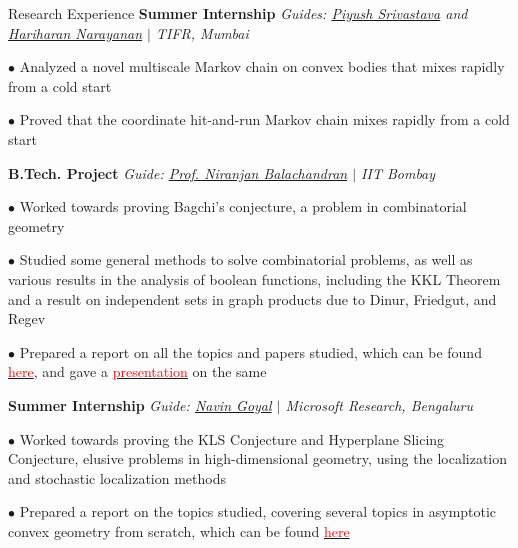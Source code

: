 
\begin{rubric}{Research Experience}
    \entry*[2022] \textbf{Summer Internship} \hfill \emph{Guides: \href{https://www.tifr.res.in/~piyush.srivastava/}{Piyush Srivastava} and \href{https://www.tifr.res.in/~hariharan.narayanan/}{Hariharan Narayanan} $\mid$ TIFR, Mumbai}

        $\bullet$ Analyzed a novel multiscale Markov chain on convex bodies that mixes rapidly from a cold start

        $\bullet$ Proved that the coordinate hit-and-run Markov chain mixes rapidly from a cold start


    \entry*[\phantom{.}2022] \textbf{B.Tech. Project} \hfill \emph{Guide: \href{https://homepages.iitb.ac.in/~niranj/}{Prof. Niranjan Balachandran} $\mid$ IIT Bombay}

        $\bullet$ Worked towards proving Bagchi's conjecture, a problem in combinatorial geometry

        $\bullet$ Studied some general methods to solve combinatorial problems, as well as various results in the analysis of boolean functions, including the KKL Theorem and a result on independent sets in graph products due to Dinur, Friedgut, and Regev

        $\bullet$ Prepared a report on all the topics and papers studied, which can be found \href{https://amitrajaraman.github.io/research/pls/btp1-report.pdf}{\textcolor{red}{here}}, and gave a \href{https://amitrajaraman.github.io/research/pls/btp-presentation.pdf}{\textcolor{red}{presentation}} on the same
    
    \entry*[2021] \textbf{Summer Internship} \hfill \emph{Guide: \href{https://www.microsoft.com/en-us/research/people/navingo/}{Navin Goyal} $\mid$ Microsoft Research, Bengaluru}
        
        $\bullet$ Worked towards proving the KLS Conjecture and Hyperplane Slicing Conjecture, elusive problems in high-dimensional geometry, using the localization and stochastic localization methods

        $\bullet$ Prepared a report on the topics studied, covering several topics in asymptotic convex geometry from scratch, which can be found \href{https://amitrajaraman.github.io/notes/convex-geometry/main.pdf}{\textcolor{red}{here}}

\end{rubric}